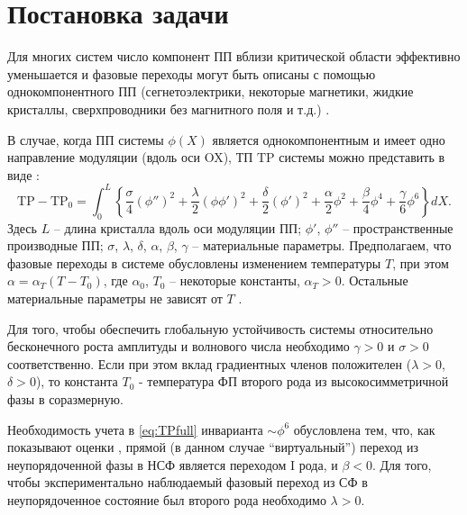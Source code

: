 
\chapter{Постановка задачи}\label{ch:task}

Для многих систем число компонент ПП вблизи критической области эффективно уменьшается и фазовые переходы могут быть описаны с помощью однокомпонентного ПП (сегнетоэлектрики, некоторые магнетики, жидкие кристаллы, сверхпроводники без магнитного поля и т.д.) \cite{Toledano1994, Izjumov1987, Buzdin1986}.

В случае, когда ПП системы $\phi(X)$ является однокомпонентным и имеет одно направление модуляции (вдоль оси OX), ТП $\mathrm{TP}$ системы  можно представить в виде \cite{Vysochanskii1994, Vysochanskii1990, Ema1990}:
\begin{equation}
\mathrm{TP} - \mathrm{TP}_0 = 
 	                      \int^L_0 \left\{\frac{\sigma}{4} \left( \phi'' \right)^2 + 
 	                      \frac{\lambda}{2}\left(\phi\phi'\right)^2 + 
 	                      \frac{\delta}{2}\left(\phi'\right)^2 +
 	                      \frac{\alpha}{2}\phi^2 + \frac{\beta}{4}\phi^4 + 
 	                      \frac{\gamma}{6}\phi^6
 	                      \right\} dX.
\label{eq:TPfull}
\end{equation}
Здесь  $L$ -- длина кристалла вдоль оси модуляции ПП;  $\phi'$, $\phi''$ -- пространственные производные ПП; $\sigma$, $\lambda$, $\delta$, $\alpha$, $\beta$, $\gamma$ -- материальные параметры.
Предполагаем, что фазовые переходы в системе обусловлены изменением температуры $T$, при этом $\alpha = \alpha_T(T-T_0)$, где $\alpha_0$, $T_0$ -- некоторые константы, $\alpha_T > 0$.
Остальные материальные параметры не зависят от $T$ \cite{Vysochanskii1994}.

Для того, чтобы обеспечить глобальную устойчивость системы относительно бесконечного роста амплитуды и волнового числа необходимо $\gamma > 0$ и $\sigma > 0$ соответственно.
Если при этом вклад градиентных членов положителен ($\lambda >0$, $\delta > 0$), то константа $T_0$ - температура ФП второго рода из высокосимметричной фазы в соразмерную.

Необходимость учета в \eqref{eq:TPfull} инварианта $\sim\phi^6$ обусловлена тем, что, как показывают оценки \cite{Vysochanskii1994}, прямой (в данном случае ``виртуальный'') переход из неупорядоченной фазы в НСФ является переходом I рода, и $\beta < 0$.
Для того, чтобы экспериментально наблюдаемый фазовый переход из СФ в неупорядоченное состояние  был второго рода необходимо $\lambda > 0$.

